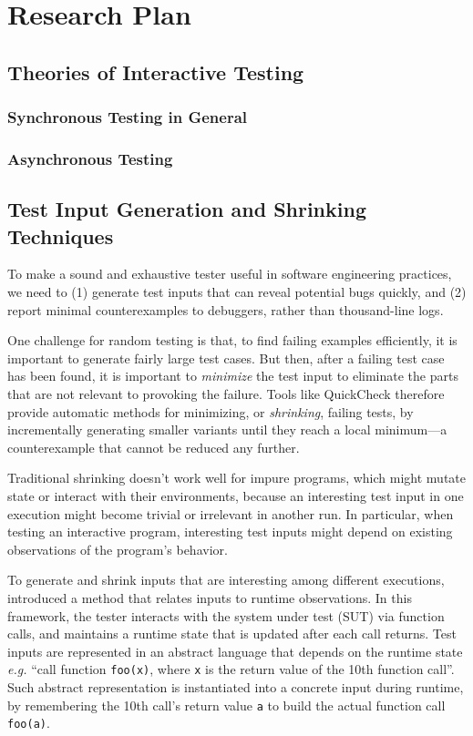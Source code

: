 \documentclass{article}
\newcommand{\ilc}[1]{\lstinline[style=customcoq]{#1}}
\theoremstyle{definition}
\begin{document}
\section{Research Plan}

\subsection{Theories of Interactive Testing}

\subsubsection{Synchronous Testing in General}
\subsubsection{Asynchronous Testing}

\subsection{Test Input Generation and Shrinking Techniques}
\label{sec:harness}
To make a sound and exhaustive tester useful in software engineering practices,
we need to (1) generate test inputs that can reveal potential bugs quickly, and
(2) report minimal counterexamples to debuggers, rather than thousand-line logs.

One challenge for random testing is that, to find failing examples efficiently,
it is important to generate fairly large test cases.  But then, after a failing
test case has been found, it is important to \textit{minimize} the test input to
eliminate the parts that are not relevant to provoking the failure.  Tools like
QuickCheck therefore provide automatic methods for minimizing, or {\em
  shrinking}, failing tests, by incrementally generating smaller variants until
they reach a local minimum---a counterexample that cannot be reduced any
further.

Traditional shrinking doesn't work well for impure programs, which might mutate
state or interact with their environments, because an interesting test input in
one execution might become trivial or irrelevant in another run.  In particular,
when testing an interactive program, interesting test inputs might depend on
existing observations of the program's behavior.

To generate and shrink inputs that are interesting among different executions,
\textcite{Hughes2007} introduced a method that relates inputs to runtime
observations.  In this framework, the tester interacts with the system under
test (SUT) via function calls, and maintains a runtime state that is updated
after each call returns.  Test inputs are represented in an abstract language
that depends on the runtime state {\it e.g.} ``call function \ilc{foo(x)}, where
\ilc{x} is the return value of the 10th function call''.  Such abstract
representation is instantiated into a concrete input during runtime, by
remembering the 10th call's return value \ilc{a} to build the actual function
call \ilc{foo(a)}.
\end{document}
